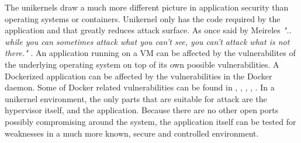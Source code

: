 The unikernels draw a much more different picture in application security than operating systems or containers. Unikernel only has the code required by the application and that greatly reduces attack surface. As once said by Meireles  \textit{".. while you can sometimes attack what you can't see, you can't attack what is not there."} \cite{mailing-list}. An application running on a VM can be affected by the vulnerabilites of the underlying operating system on top of its own possible vulnerabilities. A Dockerized application can be affected by the vulnerabilities in the Docker daemon. Some of Docker related vulnerabilities can be found in \cite{CVE-2019-14271-details}, \cite{CVE-2018-9862-details}, \cite{CVE-2018-8115-details}, \cite{CVE-2018-11757-details}, \cite{CVE-2019-5736-details}. In a unikernel environment, the only parts that are suitable for attack are the hypervisor itself, and the application. Because there are no other open ports possibly compromising around the system, the application itself can be tested for weaknesses in a much more known, secure and controlled environment.

